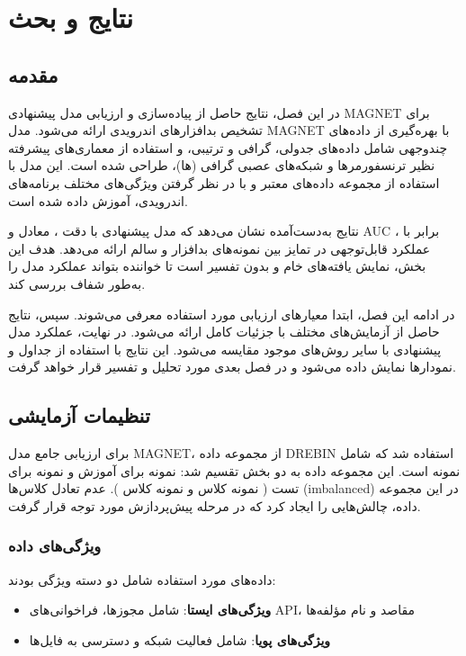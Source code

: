 \clearpage
\thispagestyle{empty}

\chapter{نتایج و بحث}\label{chap5}

\section{مقدمه}
در این فصل، نتایج حاصل از پیاده‌سازی و ارزیابی مدل پیشنهادی MAGNET برای تشخیص بدافزارهای اندرویدی ارائه می‌شود. مدل MAGNET با بهره‌گیری از داده‌های چندوجهی شامل داده‌های جدولی، گرافی و ترتیبی، و استفاده از معماری‌های پیشرفته نظیر ترنسفورمرها و شبکه‌های عصبی گرافی (ها)، طراحی شده است. این مدل با استفاده از مجموعه داده‌های معتبر و با در نظر گرفتن ویژگی‌های مختلف برنامه‌های اندرویدی، آموزش داده شده است.

نتایج به‌دست‌آمده نشان می‌دهد که مدل پیشنهادی با دقت ،  معادل  و AUC برابر با ، عملکرد قابل‌توجهی در تمایز بین نمونه‌های بدافزار و سالم ارائه می‌دهد. هدف این بخش، نمایش یافته‌های خام و بدون تفسیر است تا خواننده بتواند عملکرد مدل را به‌طور شفاف بررسی کند.

در ادامه این فصل، ابتدا معیارهای ارزیابی مورد استفاده معرفی می‌شوند. سپس، نتایج حاصل از آزمایش‌های مختلف با جزئیات کامل ارائه می‌شود. در نهایت، عملکرد مدل پیشنهادی با سایر روش‌های موجود مقایسه می‌شود. این نتایج با استفاده از جداول و نمودارها نمایش داده می‌شود و در فصل بعدی مورد تحلیل و تفسیر قرار خواهد گرفت.

\section{تنظیمات آزمایشی}
برای ارزیابی جامع مدل MAGNET، از مجموعه داده DREBIN \cite{Drebin} استفاده شد که شامل  نمونه است. این مجموعه داده به دو بخش تقسیم شد:  نمونه برای آموزش و  نمونه برای تست ( نمونه کلاس  و  نمونه کلاس ). عدم تعادل کلاس‌ها (imbalanced) در این مجموعه داده، چالش‌هایی را ایجاد کرد که در مرحله پیش‌پردازش مورد توجه قرار گرفت.

\subsection{ویژگی‌های داده}
داده‌های مورد استفاده شامل دو دسته ویژگی بودند:
\begin{itemize}
    \item \textbf{ویژگی‌های ایستا}: شامل مجوزها، فراخوانی‌های API، مقاصد و نام مؤلفه‌ها
    \item \textbf{ویژگی‌های پویا}: شامل فعالیت شبکه و دسترسی به فایل‌ها
\end{itemize}

